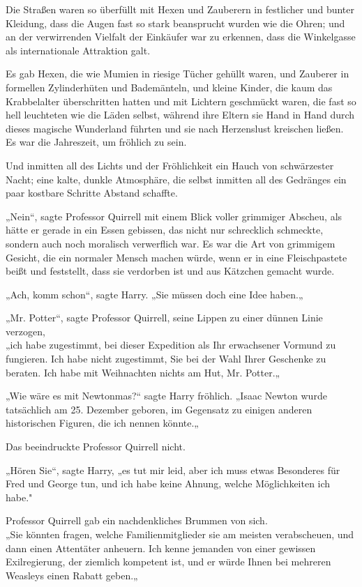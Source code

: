 {Die Straßen waren so überfüllt mit Hexen und Zauberern in festlicher und bunter Kleidung, dass die Augen fast so stark beansprucht wurden wie die Ohren; und an der verwirrenden Vielfalt der Einkäufer war zu erkennen, dass die Winkelgasse als internationale Attraktion galt.

Es gab Hexen, die wie Mumien in riesige Tücher gehüllt waren, und Zauberer in formellen Zylinderhüten und Bademänteln, und kleine Kinder, die kaum das Krabbelalter überschritten hatten und mit Lichtern geschmückt waren, die fast so hell leuchteten wie die Läden selbst, während ihre Eltern sie Hand in Hand durch dieses magische Wunderland führten und sie nach Herzenslust kreischen ließen.\\ Es war die Jahreszeit, um fröhlich zu sein.

Und inmitten all des Lichts und der Fröhlichkeit ein Hauch von schwärzester Nacht; eine kalte, dunkle Atmosphäre, die selbst inmitten all des Gedränges ein paar kostbare Schritte Abstand schaffte.

„Nein“, sagte Professor Quirrell mit einem Blick voller grimmiger Abscheu, als hätte er gerade in ein Essen gebissen, das nicht nur schrecklich schmeckte, sondern auch noch moralisch verwerflich war. Es war die Art von grimmigem Gesicht, die ein normaler Mensch machen würde, wenn er in eine Fleischpastete beißt und feststellt, dass sie verdorben ist und aus Kätzchen gemacht wurde.

„Ach, komm schon“, sagte Harry. „Sie müssen doch eine Idee haben.„

„Mr. Potter“, sagte Professor Quirrell, seine Lippen zu einer dünnen Linie verzogen,\\ „ich habe zugestimmt, bei dieser Expedition als Ihr erwachsener Vormund zu fungieren. Ich habe nicht zugestimmt, Sie bei der Wahl Ihrer Geschenke zu beraten. Ich habe mit Weihnachten nichts am Hut, Mr. Potter.„

„Wie wäre es mit Newtonmas?“ sagte Harry fröhlich. „Isaac Newton wurde tatsächlich am 25. Dezember geboren, im Gegensatz zu einigen anderen historischen Figuren, die ich nennen könnte.„

Das beeindruckte Professor Quirrell nicht.

„Hören Sie“, sagte Harry, „es tut mir leid, aber ich muss etwas Besonderes für Fred und George tun, und ich habe keine Ahnung, welche Möglichkeiten ich habe."

Professor Quirrell gab ein nachdenkliches Brummen von sich.\\ „Sie könnten fragen, welche Familienmitglieder sie am meisten verabscheuen, und dann einen Attentäter anheuern. Ich kenne jemanden von einer gewissen Exilregierung, der ziemlich kompetent ist, und er würde Ihnen bei mehreren Weasleys einen Rabatt geben.„

}
